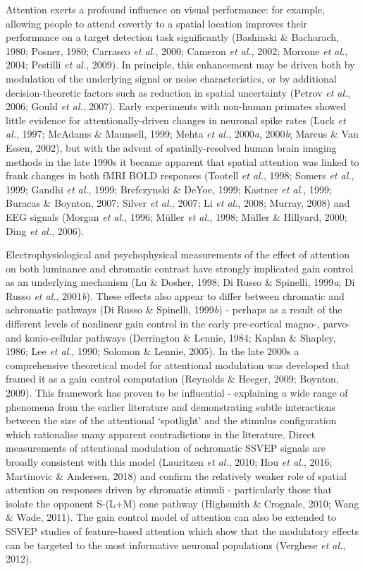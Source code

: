 \documentclass[
  letterpaper,
  DIV=11,
  numbers=noendperiod]{scrartcl}
\begin{document}
Attention exerts a profound influence on visual performance: for
example, allowing people to attend covertly to a spatial location
improves their performance on a target detection task significantly
(Bashinski \& Bacharach, 1980; Posner, 1980; Carrasco \emph{et al.},
2000; Cameron \emph{et al.}, 2002; Morrone \emph{et al.}, 2004; Pestilli
\emph{et al.}, 2009). In principle, this enhancement may be driven both
by modulation of the underlying signal or noise characteristics, or by
additional decision-theoretic factors such as reduction in spatial
uncertainty (Petrov \emph{et al.}, 2006; Gould \emph{et al.}, 2007).
Early experiments with non-human primates showed little evidence for
attentionally-driven changes in neuronal spike rates (Luck \emph{et
al.}, 1997; McAdams \& Maunsell, 1999; Mehta \emph{et al.},
2000\emph{a}, 2000\emph{b}; Marcus \& Van Essen, 2002), but with the
advent of spatially-resolved human brain imaging methods in the late
1990s it became apparent that spatial attention was linked to frank
changes in both fMRI BOLD responses (Tootell \emph{et al.}, 1998; Somers
\emph{et al.}, 1999; Gandhi \emph{et al.}, 1999; Brefczynski \& DeYoe,
1999; Kastner \emph{et al.}, 1999; Buracas \& Boynton, 2007; Silver
\emph{et al.}, 2007; Li \emph{et al.}, 2008; Murray, 2008) and EEG
signals (Morgan \emph{et al.}, 1996; Müller \emph{et al.}, 1998; Müller
\& Hillyard, 2000; Ding \emph{et al.}, 2006).

Electrophysiological and psychophysical measurements of the effect of
attention on both luminance and chromatic contrast have strongly
implicated gain control as an underlying mechanism (Lu \& Dosher, 1998;
Di Russo \& Spinelli, 1999\emph{a}; Di Russo \emph{et al.},
2001\emph{b}). These effects also appear to differ between chromatic and
achromatic pathways (Di Russo \& Spinelli, 1999\emph{b}) - perhaps as a
result of the different levels of nonlinear gain control in the early
pre-cortical magno-, parvo- and konio-cellular pathways (Derrington \&
Lennie, 1984; Kaplan \& Shapley, 1986; Lee \emph{et al.}, 1990; Solomon
\& Lennie, 2005). In the late 2000s a comprehensive theoretical model
for attentional modulation was developed that framed it as a gain
control computation (Reynolds \& Heeger, 2009; Boynton, 2009). This
framework has proven to be influential - explaining a wide range of
phenomena from the earlier literature and demonstrating subtle
interactions between the size of the attentional `spotlight' and the
stimulus configuration which rationalise many apparent contradictions in
the literature. Direct measurements of attentional modulation of
achromatic SSVEP signals are broadly consistent with this model
(Lauritzen \emph{et al.}, 2010; Hou \emph{et al.}, 2016; Martinovic \&
Andersen, 2018) and confirm the relatively weaker role of spatial
attention on responses driven by chromatic stimuli - particularly those
that isolate the opponent S-(L+M) cone pathway (Highsmith \& Crognale,
2010; Wang \& Wade, 2011). The gain control model of attention can also
be extended to SSVEP studies of feature-based attention which show that
the modulatory effects can be targeted to the most informative neuronal
populations (Verghese \emph{et al.}, 2012).
\end{document}
